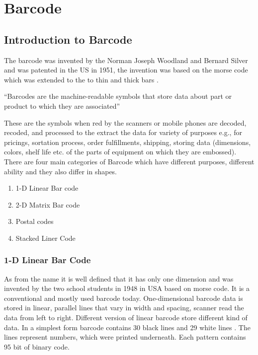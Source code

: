 %
%
%

\chapter{Barcode}

\section{Introduction to Barcode}

The barcode was invented by the Norman Joseph Woodland and Bernard Silver and was patented in the US in 1951, the invention was based on the morse code which was extended to the to thin and thick bars \cite{Woodland:1952}.

``Barcodes are the machine-readable symbols that store data about part or product to which they are associated''

These are the symbols when red by the scanners or mobile phones are decoded, recoded, and processed to the extract the data for variety of purposes e.g., for pricings, sortation process, order fulfillments, shipping, storing data (dimensions, colors, shelf life etc. of the parts of equipment on which they are embossed). 
There are four main categories of Barcode which have different purposes, different ability and they also differ in shapes.

\begin{enumerate} 
	\item 1-D Linear Bar code
	\item 2-D Matrix Bar code 
	\item Postal codes
	\item Stacked Liner Code
\end{enumerate}

\subsection{1-D Linear Bar Code}

As from the name it is well defined that it has only one dimension and was invented by the two school students in 1948 in USA based on morse code. It is a conventional and mostly used barcode today. One-dimensional barcode data is stored in linear, parallel lines that vary in width and spacing, scanner read the data from left to right. Different version of linear barcode store different kind of data. In a simplest form barcode contains 30 black lines and 29 white lines . The lines represent numbers, which were printed underneath. Each pattern contains 95 bit of binary code. \cite{Yun:2017}

